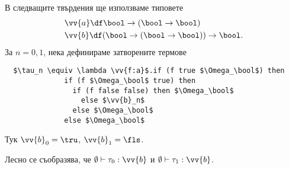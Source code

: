 В следващите твърдения ще използваме типовете
\begin{align*}
  & \vv{a} \df \bool \to (\bool \to \bool)\\
  & \vv{b} \df (\bool \to (\bool \to \bool))\to\bool.
\end{align*}
За $n = 0,1$, нека дефинираме затворените термове


\begin{lstlisting}
  $\tau_n \equiv \lambda \vv{f:a}$.if (f true $\Omega_\bool$) then
              if (f $\Omega_\bool$ true) then
                if (f false false) then $\Omega_\bool$
                  else $\vv{b}_n$
                else $\Omega_\bool$
              else $\Omega_\bool$
\end{lstlisting}

Тук $\vv{b}_0 = \tru$, $\vv{b}_1 = \fls$.

Лесно се съобразява, че $\emptyset \vdash \tau_0:\vv{b}$ и $\emptyset \vdash \tau_1:\vv{b}$.


